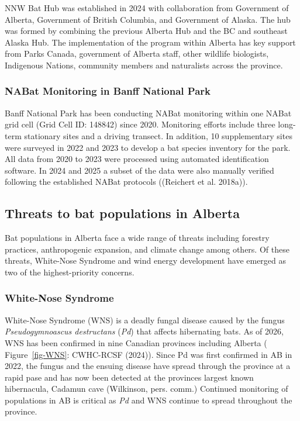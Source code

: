 \documentclass[
  letterpaper,
  DIV=11,
  numbers=noendperiod]{scrartcl}
\begin{document}
NNW Bat Hub was established in 2024 with collaboration from Government
of Alberta, Government of British Columbia, and Government of Alaska.
The hub was formed by combining the previous Alberta Hub and the BC and
southeast Alaska Hub. The implementation of the program within Alberta
has key support from Parks Canada, government of Alberta staff, other
wildlife biologists, Indigenous Nations, community members and
naturalists across the province.

\subsubsection{NABat Monitoring in Banff National
Park}\label{nabat-monitoring-in-banff-national-park}

Banff National Park has been conducting NABat monitoring within one
NABat grid cell (Grid Cell ID: 148842) since 2020. Monitoring efforts
include three long-term stationary sites and a driving transect. In
addition, 10 supplementary sites were surveyed in 2022 and 2023 to
develop a bat species inventory for the park. All data from 2020 to 2023
were processed using automated identification software. In 2024 and 2025
a subset of the data were also manually verified following the
established NABat protocols ((Reichert et al. 2018a)).

\subsection{Threats to bat populations in
Alberta}\label{threats-to-bat-populations-in-alberta}

Bat populations in Alberta face a wide range of threats including
forestry practices, anthropogenic expansion, and climate change among
others. Of these threats, White-Nose Syndrome and wind energy
development have emerged as two of the highest-priority concerns.

\subsubsection{White-Nose Syndrome}\label{white-nose-syndrome}

White-Nose Syndrome (WNS) is a deadly fungal disease caused by the
fungus \emph{Pseudogymnoascus destructans} (\emph{Pd}) that affects
hibernating bats. As of 2026, WNS has been confirmed in nine Canadian
provinces including Alberta ( Figure~\ref{fig-WNS}: CWHC-RCSF (2024)).
Since Pd was first confirmed in AB in 2022, the fungus and the ensuing
disease have spread through the province at a rapid pase and has now
been detected at the provinces largest known hibernacula, Cadamun cave
(Wilkinson, pers. comm.) Continued monitoring of populations in AB is
critical as \emph{Pd} and WNS continue to spread throughout the
province.
\end{document}
